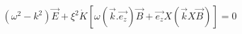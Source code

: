 \begin{equation}
({\omega}^{2}-k^{2})\vec{E}+{\xi}^{2}\dot{K}[{\omega}(\vec{k}.\vec{e_{z}})\vec{B}+\vec{e_{z}}X(\vec{k}X\vec{B})]= 0
\label{31}
\end{equation}

